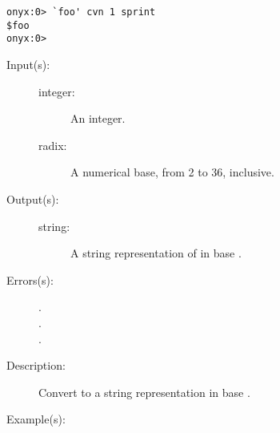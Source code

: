 \begin{description}
\begin{description}
\begin{verbatim}
onyx:0> `foo' cvn 1 sprint
$foo
onyx:0>
		\end{verbatim}
	\end{description}
\label{systemdict:cvrs}
\item[{\onyxop{integer radix}{cvrs}{string}}: ]
	\begin{description}\item[]
	\item[Input(s): ]
		\begin{description}\item[]
		\item[integer: ]
			An integer.
		\item[radix: ]
			A numerical base, from 2 to 36, inclusive.
		\end{description}
	\item[Output(s): ]
		\begin{description}\item[]
		\item[string: ]
			A string representation of  in base
			.
		\end{description}
	\item[Errors(s): ]
		\begin{description}\item[]
		\item[.]
		\item[.]
		\item[.]
		\end{description}
	\item[Description: ]
		Convert  to a string representation in base
		.
	\item[Example(s): ]\begin{verbatim}


\end{verbatim}
\end{description}
\end{description}
